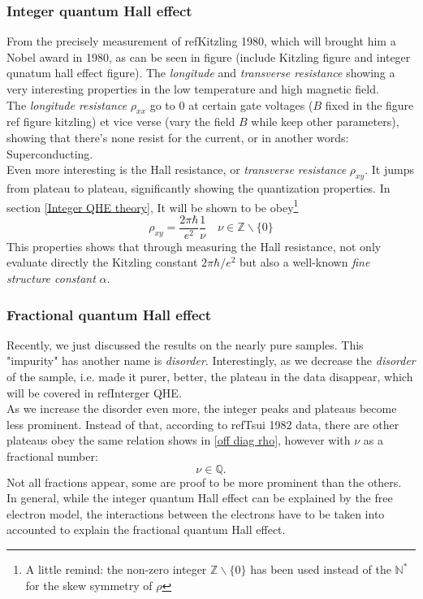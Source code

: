 \documentclass[unnumsec,webpdf,modern,large]{mam-authoring-template}%
\theoremstyle{thmstyleone}%
\theoremstyle{thmstyletwo}%
\theoremstyle{thmstylethree}%
\begin{document}
\subsubsection{Integer quantum Hall effect} \label{Integer QHE Overview}
\quad From the precisely measurement of ref{Kitzling 1980}, which will brought him a Nobel award in 1980, as can be seen in figure (include Kitzling figure and integer qunatum hall effect figure). The \textit{longitude} and \textit{transverse resistance} showing a very interesting properties in the low temperature and high magnetic field.\\\null
\quad The \textit{longitude resistance} \(\rho_{xx}\) go to 0 at certain gate voltages (\(B\) fixed in the figure ref figure kitzling) et vice verse (vary the field \(B\) while keep other parameters), showing that there's none resist for the current, or in another words: Superconducting.\\ \null
\quad Even more interesting is the Hall resistance, or \textit{transverse resistance} \(\rho_{xy}\). It jumps from plateau to plateau, significantly showing the quantization properties. In section \ref{Integer QHE theory}, It will be shown to be obey\footnote{A little remind: the non-zero integer \(\mathbb{Z} \backslash \{0\}\) has been used instead of the \(\mathbb{N}^*\) for the skew symmetry of \(\rho\)}
\begin{equation}\label{off diag rho}
	\rho_{xy} = \frac{2\pi \hbar}{e^2} \frac{1}{\nu} \quad \nu \in \mathbb{Z} \backslash \{0\}
\end{equation}
\quad This properties shows that through measuring the Hall resistance, not only evaluate directly the Kitzling constant \(2\pi \hbar/e^2\) but also a well-known \textit{fine structure constant} \(\alpha\).
\subsubsection{Fractional quantum Hall effect} \label{Fractional QHE overview}
\quad Recently, we just discussed the results on the nearly pure samples. This "impurity" has another name is \textit{disorder}. Interestingly, as we decrease the \textit{disorder} of the sample, i.e. made it purer, better, the plateau in the data disappear, which will be covered in ref{Interger QHE}.\\\null
\quad As we increase the disorder even more, the integer peaks and plateaus become less prominent. Instead of that, according to ref{Tsui 1982} data, there are other plateaus obey the same relation shows in \eqref{off diag rho}, however with \(\nu\) as a fractional number:
$$\nu \in \mathbb{Q}.$$
\quad Not all fractions appear, some are proof to be more prominent than the others.\\\null
\quad In general, while the integer quantum Hall effect can be explained by the free electron model, the interactions between the electrons have to be taken into accounted to explain the fractional quantum Hall effect.
\end{document}

